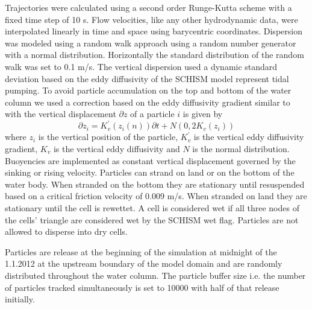 \documentclass[npg, manuscript]{copernicus}
\begin{document}
Trajectories were calculated using a second order Runge-Kutta scheme with a fixed time step of 10 \unit{s}.
Flow velocities, like any other hydrodynamic data, were interpolated linearly in time and space using barycentric coordinates.
Dispersion was modeled using a random walk approach using a random number generator with a normal distribution.
Horizontally the standard distribution of the random walk was set to 0.1 \unit{m/s}.
The vertical dispersion used a dynamic standard deviation based on the eddy diffusivity of the SCHISM model represent tidal pumping.
To avoid particle accumulation on the top and bottom of the water column we used a correction based on the eddy diffusivity gradient similar to \citep{Yamazaki2014} with the vertical displacement $\partial z$ of a particle $i$ is given by
\begin{equation}
    \partial z_{i} = K_{v}^{'}(z_{i}(n))\partial t + N(0, 2K_{v}(z_{i}))
\end{equation}
where $z_{i}$ is the vertical position of the particle, $K_{v}^{'}$ is the vertical eddy diffusivity gradient, $K_{v}$ is the vertical eddy diffusivity and $N$ is the normal distribution.
Buoyencies are implemented as constant vertical displacement governed by the sinking or rising velocity.
Particles can strand on land or on the bottom of the water body.
When stranded on the bottom they are stationary until resuspended based on a critical friction velocity of 0.009 \unit{m/s}.
When stranded on land they are stationary until the cell is rewettet.
A cell is considered wet if all three nodes of the cells' triangle are considered wet by the SCHISM wet flag.
Particles are not allowed to disperse into dry cells.

Particles are release at the beginning of the simulation at midnight of the 1.1.2012 at the upstream boundary of the model domain and are randomly distributed throughout the water column.
The particle buffer size i.e. the number of particles tracked simultaneously is set to 10000 with half of that release initially.

\end{document}
